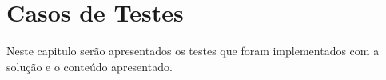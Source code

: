 \newpage
\chapter{Casos de Testes}
Neste capitulo serão apresentados os testes que foram implementados com a solução e o conteúdo apresentado.
